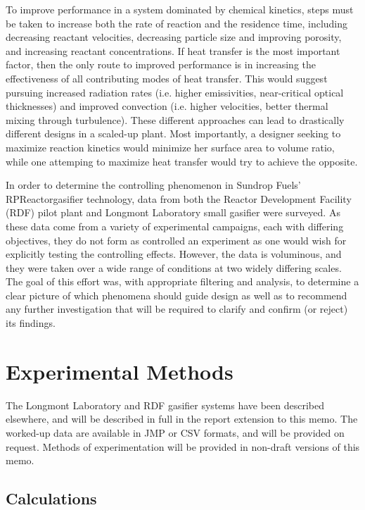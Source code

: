 \documentclass[11pt,twocolumn]{article}
\begin{document}
To improve performance in a system dominated by chemical kinetics, steps must be taken to increase both the rate of reaction and the residence time, including decreasing reactant velocities, decreasing particle size and improving porosity, and increasing reactant concentrations.  If heat transfer is the most important factor, then the only route to improved performance is in increasing the effectiveness of all contributing modes of heat transfer.  This would suggest pursuing increased radiation rates (i.e. higher emissivities, near-critical optical thicknesses) and improved convection (i.e. higher velocities, better thermal mixing through turbulence).  These different approaches can lead to drastically different designs in a scaled-up plant.  Most importantly, a designer seeking to maximize reaction kinetics would minimize her surface area to volume ratio, while one attemping to maximize heat transfer would try to achieve the opposite.

In order to determine the controlling phenomenon in Sundrop Fuels' RPReactor\texttrademark gasifier technology, data from both the Reactor Development Facility (RDF) pilot plant and Longmont Laboratory small gasifier were surveyed.  As these data come from a variety of experimental campaigns, each with differing objectives, they do not form as controlled an experiment as one would wish for explicitly testing the controlling effects.  However, the data is voluminous, and they were taken over a wide range of conditions at two widely differing scales.  The goal of this effort was, with appropriate filtering and analysis, to determine a clear picture of which phenomena should guide design as well as to recommend any further investigation that will be required to clarify and confirm (or reject) its findings.

\section*{Experimental Methods}

The Longmont Laboratory and RDF gasifier systems have been described elsewhere, and will be described in full in the report extension to this memo.  The worked-up data are available in JMP or CSV formats, and will be provided on request.  Methods of experimentation will be provided in non-draft versions of this memo.

\subsection*{Calculations}
\end{document}

